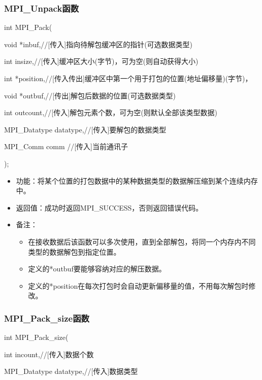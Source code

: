 \documentclass[UTF8]{article}%
\begin{document}
\subsubsection{MPI\_Unpack函数}

int MPI\_Pack(

    \qquad void            *inbuf,//[传入]指向待解包缓冲区的指针(可选数据类型) 

    \qquad int             insize,//[传入]缓冲区大小(字节)，可为空(则自动获得大小)

    \qquad int             *position,//[传入传出]缓冲区中第一个用于打包的位置(地址偏移量)(字节)，

    \qquad void            *outbuf,//[传出]解包后数据的位置(可选数据类型) 

    \qquad int             outcount,//[传入]解包元素个数，可为空(则默认全部该类型数据)

    \qquad MPI\_Datatype   datatype,//[传入]要解包的数据类型

    \qquad MPI\_Comm       comm //[传入]当前通讯子
    
);

\begin{itemize}
    \item 功能：将某个位置的打包数据中的某种数据类型的数据解压缩到某个连续内存中。
    \item 返回值：成功时返回MPI\_SUCCESS，否则返回错误代码。
    \item 备注：
    
    {
        \begin{itemize}
            \item 在接收数据后该函数可以多次使用，直到全部解包，将同一个内存内不同类型的数据解包到指定位置。
            \item 定义的*outbuf要能够容纳对应的解压数据。
            \item 定义的*position在每次打包时会自动更新偏移量的值，不用每次解包时修改。
        \end{itemize}
    }
\end{itemize}

\subsubsection{MPI\_Pack\_size函数}

int MPI\_Pack\_size(

    \qquad int           incount,//[传入]数据个数

    \qquad MPI\_Datatype datatype,//[传入]数据类型
\end{document}
